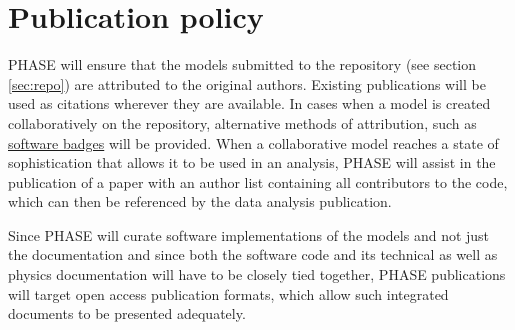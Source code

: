 \section{Publication policy}
\label{sec:publications}
PHASE will ensure that the models submitted to the repository (see section \ref{sec:repo}) are attributed to the original authors. Existing publications will be used as citations wherever they are available. In cases when a model is created collaboratively on the repository, alternative methods of attribution, such as \href{http://openbadges.org}{software badges} will be provided. When a collaborative model reaches a state of sophistication that allows it to be used in an analysis, PHASE will assist in the publication of a paper with an author list containing all contributors to the code, which can then be referenced by the data analysis publication.

Since PHASE will curate software implementations of the models and not just the documentation and since both the software code and its technical as well as physics documentation will have to be closely tied together, PHASE publications will target open access publication formats, which allow such integrated documents to be presented adequately.